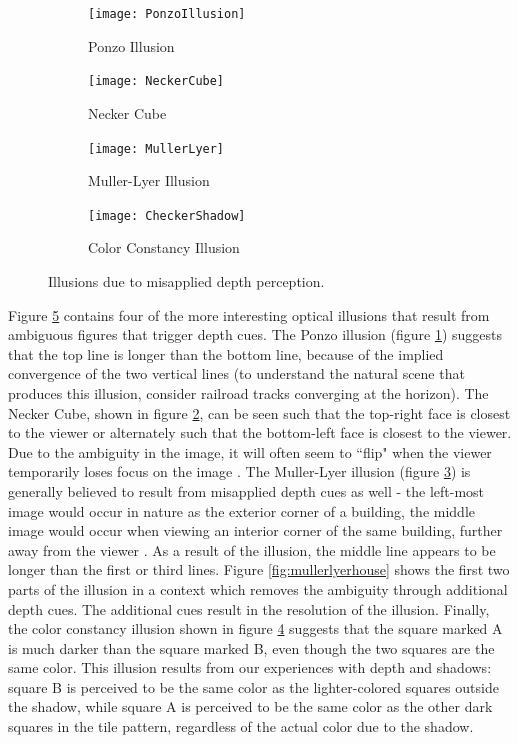 \documentclass[11pt]{isuthesis}\usepackage[]{graphicx}\usepackage[]{color}
\begin{document}
\begin{figure}[htbp]\centering
\hfil
\begin{subfigure}[b]{.35\linewidth}\centering
  \texttt{[image: PonzoIllusion]}
  \caption{Ponzo Illusion}\label{fig:Ponzo}
\end{subfigure}\hfill
\begin{subfigure}[b]{.35\linewidth}\centering
  \texttt{[image: NeckerCube]}
  \caption{Necker Cube}\label{fig:NeckerCube}
\end{subfigure}\hfil

\hfil
\begin{subfigure}[b]{.35\linewidth}\centering
  \texttt{[image: MullerLyer]}
  \caption{Muller-Lyer Illusion}\label{fig:MullerLyer}
\end{subfigure}\hfill
\begin{subfigure}[b]{.35\linewidth}\centering
  \texttt{[image: CheckerShadow]}
  \caption{Color Constancy Illusion}\label{fig:ColorConstancy}
\end{subfigure}\hfil

\caption[Depth Illusions]{Illusions due to misapplied depth perception.}\label{fig:DepthIllusions}
\end{figure}
Figure \ref{fig:DepthIllusions} contains four of the more interesting optical illusions that result from ambiguous figures that trigger depth cues. The Ponzo illusion (figure \ref{fig:Ponzo}) suggests that the top line is longer than the bottom line, because of the implied convergence of the two vertical lines (to understand the natural scene that produces this illusion, consider railroad tracks converging at the horizon). The Necker Cube, shown in figure \ref{fig:NeckerCube}, can be seen such that the top-right face is closest to the viewer or alternately such that the bottom-left face is closest to the viewer. Due to the ambiguity in the image, it will often seem to ``flip" when the viewer temporarily loses focus on the image \citep{gregory1997knowledge}. The Muller-Lyer illusion (figure \ref{fig:MullerLyer}) is generally believed to result from misapplied depth cues as well - the left-most image would occur in nature as the exterior corner of a building, the middle image would occur when viewing an interior corner of the same building, further away from the viewer \citep{ward1977case, gregory1968perceptual, fisher1970experimental}. As a result of the illusion, the middle line appears to be longer than the first or third lines. Figure \ref{fig:mullerlyerhouse} shows the first two parts of the illusion in a context which removes the ambiguity through additional depth cues. The additional cues result in the resolution of the illusion. Finally, the color constancy illusion shown in figure \ref{fig:ColorConstancy} suggests that the square marked A is much darker than the square marked B, even though the two squares are the same color. This illusion results from our experiences with depth and shadows: square B is perceived to be the same color as the lighter-colored squares outside the shadow, while square A is perceived to be the same color as the other dark squares in the tile pattern, regardless of the actual color due to the shadow. 
\end{document}
